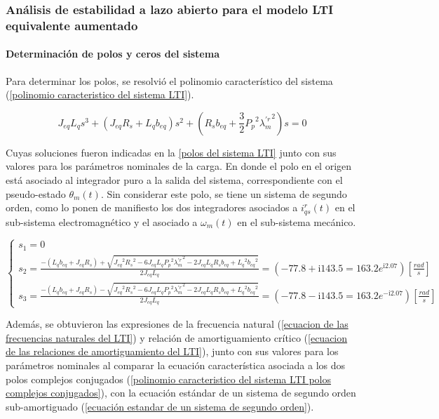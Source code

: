 \documentclass[a4paper, 10pt, onecolumn,journal]{ieeeconf}
\begin{document}
\subsubsection{\textbf{Análisis de estabilidad a lazo abierto para el modelo LTI equivalente aumentado}}
\paragraph{\textbf{Determinación de polos y ceros del sistema}}
Para determinar los polos, se resolvió el polinomio característico del sistema (\cref{polinomio caracteristico del sistema LTI}).

\begin{equation}
	J_{eq} L_{q} s^3 +\left( J_{eq} R_{s} + L_{q} b_{eq} \right)s^2 + \left( R_{s} b_{eq} + \dfrac{3}{2} {P_{p}}^2 { \lambda^{'r}_m}^2\right) s = 0
    \label{polinomio caracteristico del sistema LTI}
\end{equation}

Cuyas soluciones fueron indicadas en la \cref{polos del sistema LTI} junto con sus valores
para los parámetros nominales de la carga.
En donde el polo en el origen está asociado al integrador puro a la salida
del sistema, correspondiente con
el pseudo-estado $\theta_m(t)$. Sin considerar este polo, se tiene un sistema de
segundo orden, como lo ponen de manifiesto los dos integradores asociados a $i^r_{qs}(t)$ en el
sub-sistema electromagnético y el asociado a $\omega_m(t)$ en el sub-sistema mecánico.

\begin{equation}
	\begin{cases}
		s_1 = 0\\
		s_2 = \frac{-\left( L_{q} b_{eq} + J_{eq} R_{s}\right)  + \sqrt{{J_{eq}}^2 {R_{s}}^2 - 6 J_{eq} L_{q} {P_{p}}^2 {\lambda^{'r}_m}^2 - 2 J_{eq} L_{q} R_{s} b_{eq}+{L_{q}}^2 {b_{eq}}^2} }{2 J_{eq} L_{q}} = \left(-77.8+\mathrm{i}143.5 = 163.2e^{\mathrm{i}2.07}\right)\left[\frac{rad}{s}\right]\\
		s_3 = \frac{-\left( L_{q} b_{eq} + J_{eq} R_{s}\right)  - \sqrt{{J_{eq}}^2 {R_{s}}^2 - 6 J_{eq} L_{q} {P_{p}}^2 {\lambda^{'r}_m}^2 - 2 J_{eq} L_{q} R_{s} b_{eq}+{L_{q}}^2 {b_{eq}}^2} }{2 J_{eq} L_{q}} = \left(-77.8-\mathrm{i}143.5 = 163.2e^{-\mathrm{i}2.07}\right)\left[\frac{rad}{s}\right]
	\end{cases}\label{polos del sistema LTI}
\end{equation}

Además, se obtuvieron las expresiones de la frecuencia natural (\cref{ecuacion de las frecuencias naturales del LTI}) y relación de amortiguamiento crítico (\cref{ecuacion de las relaciones de amortiguamiento del LTI}), junto con sus valores
para los parámetros nominales al comparar la ecuación característica asociada a los dos polos complejos conjugados (\cref{polinomio caracteristico del sistema LTI polos complejos conjugados}), con  la ecuación estándar de un sistema de segundo orden sub-amortiguado (\cref{ecuación estandar de un sistema de segundo orden}).
\end{document}
